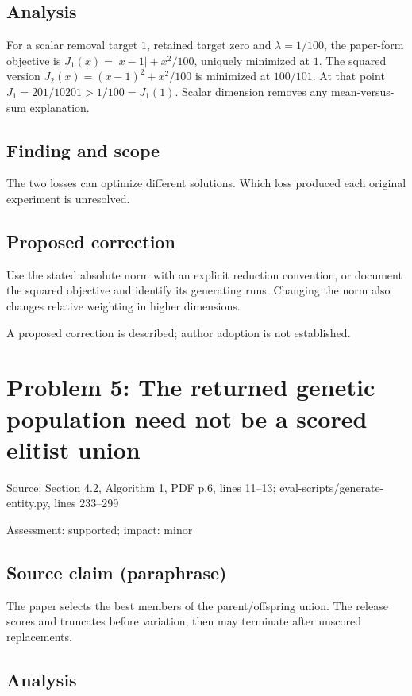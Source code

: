 \documentclass[11pt]{article}
\begin{document}
\subsection*{Analysis}

For a scalar removal target \(1\), retained target zero and \(\lambda=1/100\), the paper-form objective is \(J_1(x)=|x-1|+x^2/100\), uniquely minimized at \(1\). The squared version \(J_2(x)=(x-1)^2+x^2/100\) is minimized at \(100/101\). At that point \(J_1=201/10201>1/100=J_1(1)\). Scalar dimension removes any mean-versus-sum explanation.

\subsection*{Finding and scope}

The two losses can optimize different solutions. Which loss produced each original experiment is unresolved.

\subsection*{Proposed correction}

Use the stated absolute norm with an explicit reduction convention, or document the squared objective and identify its generating runs. Changing the norm also changes relative weighting in higher dimensions.

A proposed correction is described; author adoption is not established.

\section*{Problem 5: The returned genetic population need not be a scored elitist union}

Source: Section 4.2, Algorithm 1, PDF p.6, lines 11–13; eval-scripts/generate-entity.py, lines 233–299

Assessment: supported; impact: minor

\subsection*{Source claim (paraphrase)}

The paper selects the best members of the parent/offspring union. The release scores and truncates before variation, then may terminate after unscored replacements.

\subsection*{Analysis}
\end{document}
